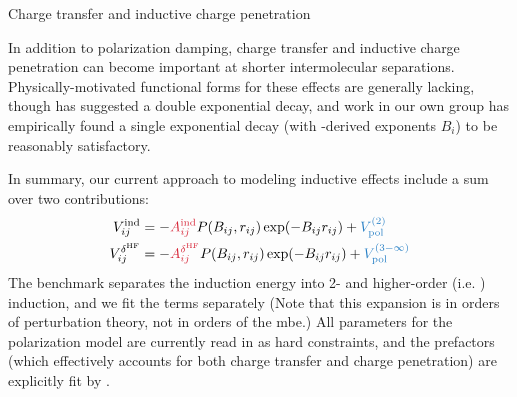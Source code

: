 
\begin{paragraph}{Charge transfer and inductive charge penetration}

In addition to polarization damping, charge transfer and inductive charge
penetration can become important at shorter intermolecular separations.
Physically-motivated functional forms for these effects are generally lacking,
though \citeauthor{Misquitta2013} has suggested a double exponential decay,
and work in our own group has empirically found a single exponential decay
(with \isa-derived exponents $B_i$) to be reasonably satisfactory.

\end{paragraph}


In summary, our current approach to modeling inductive effects include a sum
over two contributions:
%
\begin{align}
\vind_{ij} &= -\textcolor{fit}{\Aind{ij}} P(\B, r_{ij}) \exp(-\B r_{ij}) + \textcolor{mon}{\vdrudeind} \\
\vdhf_{ij} &= -\textcolor{fit}{\Adhf{ij}} P(\B, r_{ij}) \exp(-\B r_{ij}) + \textcolor{mon}{\vdrudescf}
\end{align}
%
The \sapt benchmark separates the induction energy into 2- and higher-order
(i.e. \dhf) induction, and we fit the terms separately (Note that this expansion is in orders of perturbation theory,
not in orders of the \acrlong{mbe}.)
All parameters for the polarization model \vdrude are currently read in as hard
constraints, and the \/ prefactors (which effectively accounts for both
charge transfer and charge penetration) are explicitly fit by \pointer.

